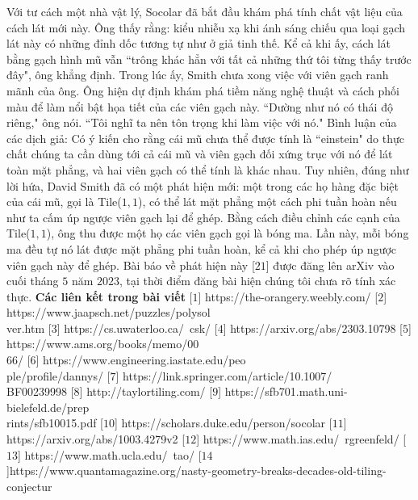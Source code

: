 \begin{multicols}{2}
	\vskip 0.1cm
	Với tư cách một nhà vật lý, Socolar đã bắt đầu khám phá tính chất vật liệu của cách lát mới này. Ông thấy rằng: kiểu nhiễu xạ khi ánh sáng chiếu qua loại gạch lát này có những đỉnh dốc tương tự như ở giả tinh thế. Kể cả khi ấy, cách lát bằng gạch hình mũ vẫn ``trông khác hẳn với tất cả những thứ tôi từng thấy trước đây", ông khẳng định.
	\vskip 0.1cm
	Trong lúc ấy, Smith chưa xong việc với viên gạch ranh mãnh của ông. Ông hiện dự định khám phá tiềm năng nghệ thuật và cách phối màu để làm nổi bật họa tiết của các viên gạch này. ``Dường như nó có thái độ riêng," ông nói. ``Tôi nghĩ ta nên tôn trọng khi làm việc với nó."
	\vskip 0.1cm
	Bình luận của các dịch giả: Có ý kiến cho rằng cái mũ chưa thể được tính là ``einstein" do thực chất chúng ta cần dùng tới cả cái mũ và viên gạch đối xứng trục với nó để lát toàn mặt phẳng, và hai viên gạch có thể tính là khác nhau. Tuy nhiên, đúng như lời hứa, David Smith đã có một phát hiện mới: một trong các họ hàng đặc biệt của cái mũ, gọi là Tile($1, 1$), có thể lát mặt phẳng một cách phi tuần hoàn nếu như ta cấm úp ngược viên gạch lại để ghép. Bằng cách điều chỉnh các cạnh của Tile($1, 1$), ông thu được một họ các viên gạch gọi là bóng ma. Lần này, mỗi bóng ma đều tự nó lát được mặt phẳng phi tuần hoàn, kể cả khi cho phép úp ngược viên gạch này để ghép. Bài báo về phát hiện này [$21$] được đăng lên arXiv vào cuối tháng $5$ năm $2023$, tại thời điểm đăng bài hiện chúng tôi chưa rõ tính xác thực.
	\vskip 0.1cm
	\textbf{\color{duongvaotoanhoc}Các liên kết trong bài viết}
	\vskip 0.1cm 
	[$1$] https://the-orangery.weebly.com/
	\vskip 0.1cm
	[$2$] https://www.jaapsch.net/puzzles/polysol\\
	ver.htm
	\vskip 0.1cm
	[$3$] https://cs.uwaterloo.ca/~csk/
	\vskip 0.1cm
	[$4$] https://arxiv.org/abs/2303.10798
	\vskip 0.1cm
	[$5$] https://www.ams.org/books/memo/00\\
	66/
	\vskip 0.1cm
	[$6$] https://www.engineering.iastate.edu/peo\\
	ple/profile/dannys/
	\vskip 0.1cm
	[$7$] https://link.springer.com/article/10.1007/\\
	BF00239998
	\vskip 0.1cm
	[$8$] http://taylortiling.com/
	\vskip 0.1cm
	[$9$] https://sfb701.math.uni-bielefeld.de/prep\\
	rints/sfb10015.pdf
	\vskip 0.1cm
	[$10$] https://scholars.duke.edu/person/socolar
	\vskip 0.1cm
	[$11$] https://arxiv.org/abs/1003.4279v2
	\vskip 0.1cm
	[$12$] https://www.math.ias.edu/~rgreenfeld/
	\vskip 0.1cm
	[$13$] https://www.math.ucla.edu/~tao/
	\vskip 0.1cm
	[$14$]https://www.quantamagazine.org/nasty-geometry-breaks-decades-old-tiling-conjectur\\

\end{multicols}
